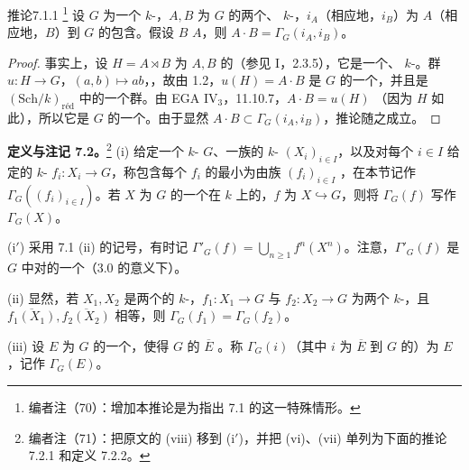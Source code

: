 \begin{SGAresult}{推论}{7.1.1}
\footnote{编者注（70）：增加本推论是为指出 7.1 的这一特殊情形。}
设 $G$ 为一个 $k$-，$A,B$ 为 $G$ 的两个、 $k$-，$i_A$（相应地，$i_B$）为 $A$（相应地，$B$）到 $G$ 的包含。假设 $B$  $A$，则 $A\cdot B=\Gamma_G(i_A,i_B)$。
\end{SGAresult}
\begin{proof}
事实上，设 $H=A\rtimes B$ 为 $A,B$ 的（参见 I，2.3.5），它是一个、 $k$-。群 $u:H\to G$，$(a,b)\mapsto ab$，，故由 1.2，$u(H)=A\cdot B$ 是 $G$ 的一个，并且是 $(\mathrm{Sch}/k)_{\mathrm{r\text{é}d}}$ 中的一个群。由 EGA $\mathrm{IV}_3$，11.10.7，$A\cdot B=u(H)$ （因为 $H$ 如此），所以它是 $G$ 的一个。由于显然 $A\cdot B\subset\Gamma_G(i_A,i_B)$，推论随之成立。
\end{proof}

\textbf{定义与注记 7.2。}\footnote{编者注（71）：把原文的 (viii) 移到 (i$'$)，并把 (vi)、(vii) 单列为下面的推论 7.2.1 和定义 7.2.2。}
(i) 给定一个 $k$- $G$、一族的 $k$- $(X_i)_{i\in I}$，以及对每个 $i\in I$ 给定的 $k$- $f_i:X_i\to G$，称包含每个 $f_i$ 的最小为由族 $(f_i)_{i\in I}$ ，在本节记作 $\Gamma_G((f_i)_{i\in I})$。若 $X$ 为 $G$ 的一个在 $k$ 上的，$f$ 为 $X\hookrightarrow G$，则将 $\Gamma_G(f)$ 写作 $\Gamma_G(X)$。

(i$'$) 采用 7.1 (ii) 的记号，有时记 $\Gamma'_G(f)=\bigcup_{n\geq1}f^n(X^n)$。注意，$\Gamma'_G(f)$ 是 $G$ 中对的一个（3.0 的意义下）。

(ii) 显然，若 $X_1,X_2$ 是两个的 $k$-，$f_1:X_1\to G$ 与 $f_2:X_2\to G$ 为两个 $k$-，且 $\overline{f_1(X_1)},\overline{f_2(X_2)}$ 相等，则 $\Gamma_G(f_1)=\Gamma_G(f_2)$。

(iii) 设 $E$ 为 $G$ 的一个，使得 $G$ 的 $\overline E$ 。称 $\Gamma_G(i)$（其中 $i$ 为 $\overline E$ 到 $G$ 的）为 $E$ ，记作 $\Gamma_G(E)$。

